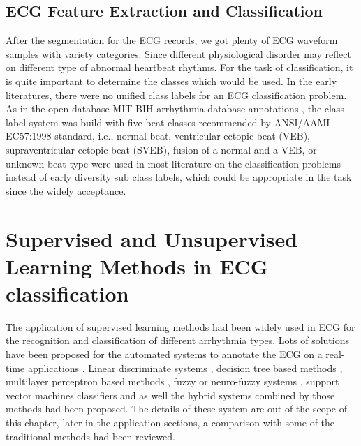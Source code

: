 \documentclass[graybox]{svmult}
\begin{document}
\subsection{ECG Feature Extraction and Classification}
After the segmentation for the ECG records, we got plenty of ECG waveform samples with variety categories. Since different physiological disorder may reflect on different type of abnormal heartbeat rhythms. For the task of classification, it is quite important to determine the classes which would be used. In the early literatures, there were no unified class labels for an ECG classification problem. As in the open database MIT-BIH arrhythmia database annotations \citep{mark1982annotated, moody1990bih}, the class label system was build with five beat classes recommended by ANSI/AAMI EC57:1998 standard, i.e., normal beat, ventricular ectopic beat (VEB), supraventricular ectopic beat (SVEB), fusion of a normal and a VEB, or unknown beat type were used in most literature on the classification problems instead of early diversity sub class labels, which could be appropriate in the task since the widely acceptance. 


\section{Supervised and Unsupervised Learning Methods in ECG classification}

The application of supervised learning methods had been widely used in ECG for the recognition and classification of different arrhythmia types.
Lots of solutions have been proposed for the automated systems to annotate the ECG on a real-time applications \citep[e.g.][]{osowski2001ecg, vullings1998automated, sayadi2009model}. 
Linear discriminate systems \citep[e.g][]{shinwari2012classification}, decision tree based methods \citep[e.g.][]{krasteva2014classification, charfi2012comparative}, multilayer perceptron based methods \citep[e.g.][]{minami1999real}, fuzzy or neuro-fuzzy systems \citep[e.g.][]{engin2004ecg, vafaie2014heart}, support vector machines classifiers \citep[e.g.][]{ubeyli2007ecg} and as well the hybrid systems \citep[e.g.][]{homaeinezhad2012ecg, vanitha2013hybrid} combined by those methods had been proposed. The details of these system are out of the scope of this chapter, later in the application sections, a comparison with some of the traditional methods had been reviewed.
\end{document}

